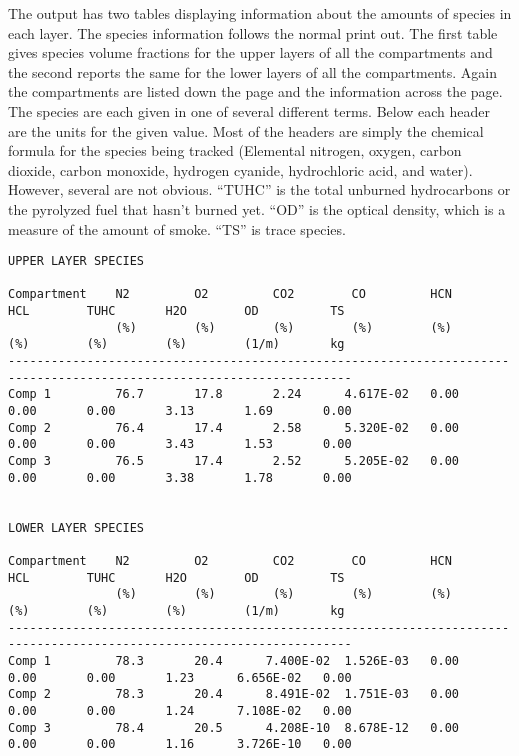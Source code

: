 The output has two tables displaying information about the amounts of species in each layer. The species information follows the normal print out.  The first table gives species volume fractions for the upper layers of all the compartments and the second reports the same for the lower layers of all the compartments.  Again the compartments are listed down the page and the information across the page.  The species are each given in one of several different terms.  Below each header are the units for the given value.  Most of the headers are simply the chemical formula for the species being tracked (Elemental nitrogen, oxygen, carbon dioxide, carbon monoxide, hydrogen cyanide, hydrochloric acid, and water).  However, several are not obvious.  ``TUHC'' is the total unburned hydrocarbons or the pyrolyzed fuel that hasn't burned yet.  ``OD'' is the optical density, which is a measure of the amount of smoke. ``TS'' is trace species.

\begin{lstlisting}[basicstyle=\tiny]
UPPER LAYER SPECIES

Compartment    N2         O2         CO2        CO         HCN        HCL        TUHC       H2O        OD          TS
               (%)        (%)        (%)        (%)        (%)        (%)        (%)        (%)        (1/m)       kg
----------------------------------------------------------------------------------------------------------------------
Comp 1         76.7       17.8       2.24      4.617E-02   0.00       0.00       0.00       3.13       1.69       0.00
Comp 2         76.4       17.4       2.58      5.320E-02   0.00       0.00       0.00       3.43       1.53       0.00
Comp 3         76.5       17.4       2.52      5.205E-02   0.00       0.00       0.00       3.38       1.78       0.00


LOWER LAYER SPECIES

Compartment    N2         O2         CO2        CO         HCN        HCL        TUHC       H2O        OD          TS
               (%)        (%)        (%)        (%)        (%)        (%)        (%)        (%)        (1/m)       kg
----------------------------------------------------------------------------------------------------------------------
Comp 1         78.3       20.4      7.400E-02  1.526E-03   0.00       0.00       0.00       1.23      6.656E-02   0.00
Comp 2         78.3       20.4      8.491E-02  1.751E-03   0.00       0.00       0.00       1.24      7.108E-02   0.00
Comp 3         78.4       20.5      4.208E-10  8.678E-12   0.00       0.00       0.00       1.16      3.726E-10   0.00
\end{lstlisting}

